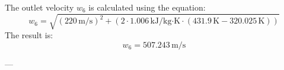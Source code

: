The outlet velocity \( w_6 \) is calculated using the equation:  
\[
w_6 = \sqrt{(220 \, \text{m/s})^2 + (2 \cdot 1.006 \, \text{kJ/kg·K} \cdot (431.9 \, \text{K} - 320.025 \, \text{K}))}
\]  
The result is:  
\[
w_6 = 507.243 \, \text{m/s}
\]

---